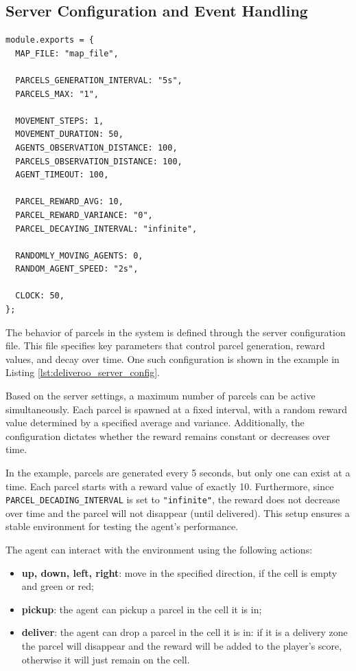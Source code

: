 \subsection{Server Configuration and Event Handling}
\label{sub:server_configuration_event_handling}
\vspace{10mm}
\begin{codewindow}
    \begin{lstlisting}
module.exports = {
  MAP_FILE: "map_file",

  PARCELS_GENERATION_INTERVAL: "5s",
  PARCELS_MAX: "1",

  MOVEMENT_STEPS: 1,
  MOVEMENT_DURATION: 50,
  AGENTS_OBSERVATION_DISTANCE: 100,
  PARCELS_OBSERVATION_DISTANCE: 100,
  AGENT_TIMEOUT: 100,

  PARCEL_REWARD_AVG: 10,
  PARCEL_REWARD_VARIANCE: "0",
  PARCEL_DECAYING_INTERVAL: "infinite",

  RANDOMLY_MOVING_AGENTS: 0,
  RANDOM_AGENT_SPEED: "2s",

  CLOCK: 50,
};
\end{lstlisting}
\end{codewindow}
\vspace{10mm}
The behavior of parcels in the system is defined through the server
configuration file. This file specifies key parameters that control parcel generation,
reward values, and decay over time. One such configuration is shown in the
example in Listing \ref{lst:deliveroo_server_config}.

Based on the server settings, a maximum number of parcels can be active simultaneously.
Each parcel is spawned at a fixed interval, with a random reward value determined
by a specified average and variance. Additionally, the configuration dictates whether
the reward remains constant or decreases over time.

In the example, parcels are generated every 5 seconds, but only one can exist at
a time. Each parcel starts with a reward value of exactly 10. Furthermore, since
\texttt{PARCEL\_DECADING\_INTERVAL} is set to \texttt{"infinite"}, the reward
does not decrease over time and the parcel will not disappear (until delivered).
This setup ensures a stable environment for testing the agent's performance.

The agent can interact with the environment using the following actions:
\begin{itemize}
  \item \textbf{up, down, left, right}: move in the specified direction, if the
    cell is empty and green or red;

  \item \textbf{pickup}: the agent can pickup a parcel in the cell it is in;

  \item \textbf{deliver}: the agent can drop a parcel in the cell it is in: if
    it is a delivery zone the parcel will disappear and the reward will be added
    to the player's score, otherwise it will just remain on the cell.
\end{itemize}

